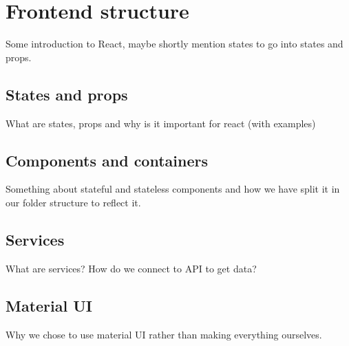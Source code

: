 \section{Frontend structure}
Some introduction to React, maybe shortly mention states to go into states and props.

\subsection{States and props}
What are states, props and why is it important for react (with examples)

\subsection{Components and containers}
Something about stateful and stateless components and how we have split it in our folder structure to reflect it.


\subsection{Services}
What are services? How do we connect to API to get data?

\subsection{Material UI}
Why we chose to use material UI rather than making everything ourselves.
